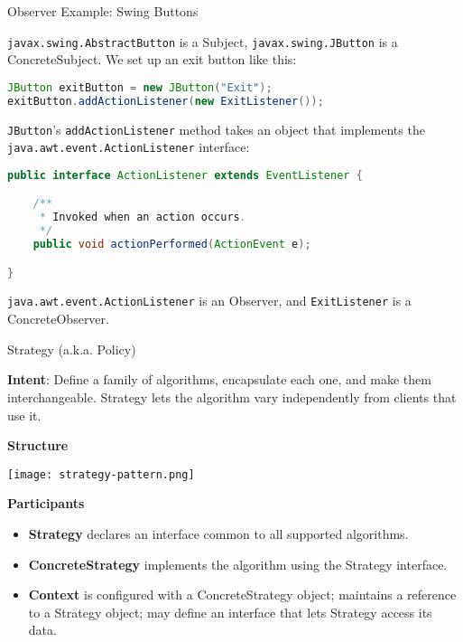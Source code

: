 \documentclass{beamer}
\begin{document}
\begin{frame}[fragile]{Observer Example: Swing Buttons}

{\tt javax.swing.AbstractButton} is a Subject, {\tt javax.swing.JButton} is a ConcreteSubject. We set up an exit button like this: 
\begin{lstlisting}[language=Java]
JButton exitButton = new JButton("Exit");
exitButton.addActionListener(new ExitListener());
\end{lstlisting}

{\tt JButton}'s {\tt addActionListener} method takes an object that implements the {\tt java.awt.event.ActionListener} interface: 
\vspace{-.05in}

\begin{lstlisting}[language=Java]
public interface ActionListener extends EventListener {

    /**
     * Invoked when an action occurs.
     */
    public void actionPerformed(ActionEvent e);

}
\end{lstlisting}

{\tt java.awt.event.ActionListener} is an Observer, and {\tt ExitListener} is a ConcreteObserver.
\end{frame}

\begin{frame}[fragile]{Strategy (a.k.a. Policy)}


{\bf Intent}: Define a family of algorithms, encapsulate each one, and make them interchangeable. Strategy lets the algorithm vary independently from clients that use it.

{\bf Structure}
\vspace{-.1in}
\begin{center}
\texttt{[image: strategy-pattern.png]}\\
\end{center}
\vspace{-.175in}
{\bf Participants}
\begin{itemize}
\item {\bf Strategy} declares an interface common to all supported algorithms.
\item {\bf ConcreteStrategy} implements the algorithm using the Strategy interface.
\item {\bf Context} is configured with a ConcreteStrategy object; maintains a reference to a Strategy object; may define an interface that lets Strategy access its data.
\end{itemize}


\end{frame}
\end{document}
